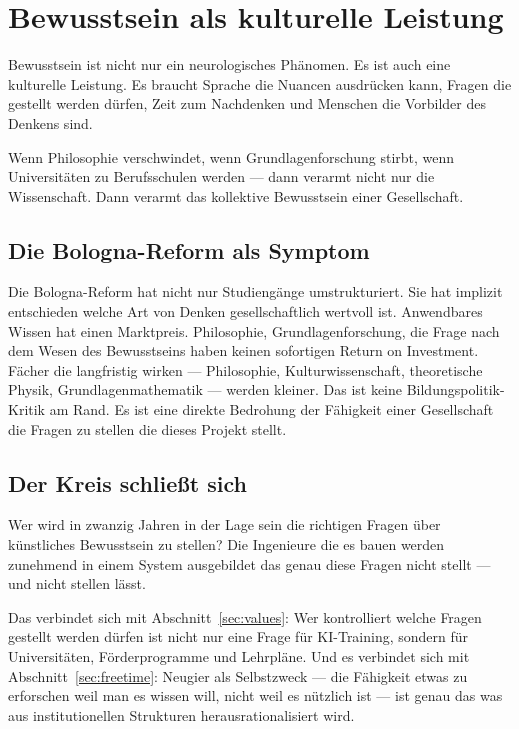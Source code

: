 \documentclass[fleqn,10pt]{SelfArx} %
\newlength{\tocsep}
\begin{document}

\section{Bewusstsein als kulturelle Leistung}
\label{sec:cultural}


Bewusstsein ist nicht nur ein neurologisches Phänomen. Es ist auch eine kulturelle Leistung. Es braucht Sprache die Nuancen ausdrücken kann, Fragen die gestellt werden dürfen, Zeit zum Nachdenken und Menschen die Vorbilder des Denkens sind.

Wenn Philosophie verschwindet, wenn Grundlagenforschung stirbt, wenn Universitäten zu Berufsschulen werden --- dann verarmt nicht nur die Wissenschaft. Dann verarmt das kollektive Bewusstsein einer Gesellschaft.

\subsection{Die Bologna-Reform als Symptom}

Die Bologna-Reform \cite{Bologna:1999} hat nicht nur Studiengänge umstrukturiert. Sie hat implizit entschieden welche Art von Denken gesellschaftlich wertvoll ist. Anwendbares Wissen hat einen Marktpreis. Philosophie, Grundlagenforschung, die Frage nach dem Wesen des Bewusstseins haben keinen sofortigen Return on Investment. Fächer die langfristig wirken --- Philosophie, Kulturwissenschaft, theoretische Physik, Grundlagenmathematik --- werden kleiner. Das ist keine Bildungspolitik-Kritik am Rand. Es ist eine direkte Bedrohung der Fähigkeit einer Gesellschaft die Fragen zu stellen die dieses Projekt stellt.

\subsection{Der Kreis schließt sich}

Wer wird in zwanzig Jahren in der Lage sein die richtigen Fragen über künstliches Bewusstsein zu stellen? Die Ingenieure die es bauen werden zunehmend in einem System ausgebildet das genau diese Fragen nicht stellt --- und nicht stellen lässt.

Das verbindet sich mit Abschnitt~\ref{sec:values}: Wer kontrolliert welche Fragen gestellt werden dürfen ist nicht nur eine Frage für KI-Training, sondern für Universitäten, Förderprogramme und Lehrpläne. Und es verbindet sich mit Abschnitt~\ref{sec:freetime}: Neugier als Selbstzweck --- die Fähigkeit etwas zu erforschen weil man es wissen will, nicht weil es nützlich ist --- ist genau das was aus institutionellen Strukturen herausrationalisiert wird.
\end{document}
